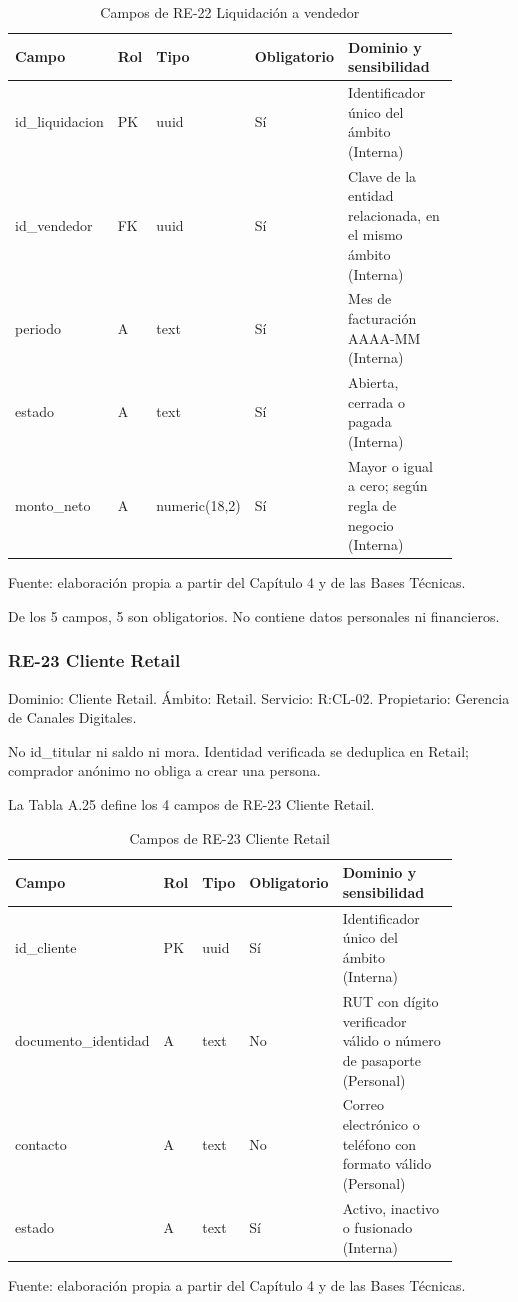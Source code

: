 \documentclass[11pt]{article}
\begin{document}
\begin{table}[htbp]
\caption{Campos de RE-22 Liquidación a vendedor}\label{tab:d_re22}
\centering
\begin{tabular}{@{}p{0.167\linewidth}p{0.070\linewidth}p{0.079\linewidth}p{0.097\linewidth}p{0.465\linewidth}@{}}
\toprule Campo & Rol & Tipo & Obligatorio & Dominio y sensibilidad \\
\midrule
id\_liquidacion & PK & uuid & Sí & Identificador único del ámbito (Interna) \\
id\_vendedor & FK & uuid & Sí & Clave de la entidad relacionada, en el mismo ámbito (Interna) \\
periodo & A & text & Sí & Mes de facturación AAAA-MM (Interna) \\
estado & A & text & Sí & Abierta, cerrada o pagada (Interna) \\
monto\_neto & A & numeric(18,2) & Sí & Mayor o igual a cero; según regla de negocio (Interna) \\
\bottomrule
\end{tabular}
\par\smallskip
{\raggedright Fuente: elaboración propia a partir del Capítulo 4 y de las Bases Técnicas.\par}
\end{table}


De los 5 campos, 5 son obligatorios. No contiene datos personales ni financieros.

\subsubsection{RE-23 Cliente Retail}

Dominio: Cliente Retail. Ámbito: Retail. Servicio: R:CL-02. Propietario: Gerencia de Canales Digitales.

No id\_titular ni saldo ni mora. Identidad verificada se deduplica en Retail; comprador anónimo no obliga a crear una persona.

La Tabla A.25 define los 4 campos de RE-23 Cliente Retail.

\begin{table}[htbp]
\caption{Campos de RE-23 Cliente Retail}\label{tab:d_re23}
\centering
\begin{tabular}{@{}p{0.167\linewidth}p{0.070\linewidth}p{0.079\linewidth}p{0.097\linewidth}p{0.465\linewidth}@{}}
\toprule Campo & Rol & Tipo & Obligatorio & Dominio y sensibilidad \\
\midrule
id\_cliente & PK & uuid & Sí & Identificador único del ámbito (Interna) \\
documento\_identidad & A & text & No & RUT con dígito verificador válido o número de pasaporte (Personal) \\
contacto & A & text & No & Correo electrónico o teléfono con formato válido (Personal) \\
estado & A & text & Sí & Activo, inactivo o fusionado (Interna) \\
\bottomrule
\end{tabular}
\par\smallskip
{\raggedright Fuente: elaboración propia a partir del Capítulo 4 y de las Bases Técnicas.\par}
\end{table}
\end{document}
